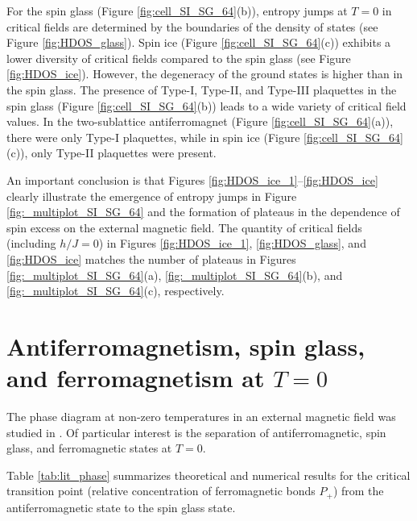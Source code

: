 \documentclass[preprint,12pt]{elsarticle}
\begin{document}
	For the spin glass (Figure \ref{fig:cell_SI_SG_64}(b)), entropy jumps at $T = 0$ in critical fields are determined by the boundaries of the density of states (see Figure \ref{fig:HDOS_glass}).
	Spin ice (Figure \ref{fig:cell_SI_SG_64}(c)) exhibits a lower diversity of critical fields compared to the spin glass (see Figure \ref{fig:HDOS_ice}). However, the degeneracy of the ground states is higher than in the spin glass.
	The presence of Type-I, Type-II, and Type-III plaquettes in the spin glass (Figure \ref{fig:cell_SI_SG_64}(b)) leads to a wide variety of critical field values. In the two-sublattice antiferromagnet (Figure \ref{fig:cell_SI_SG_64}(a)), there were only Type-I plaquettes, while in spin ice (Figure \ref{fig:cell_SI_SG_64}(c)), only Type-II plaquettes were present.
	
	An important conclusion is that Figures \ref{fig:HDOS_ice_1}–\ref{fig:HDOS_ice} clearly illustrate the emergence of entropy jumps in Figure \ref{fig:_multiplot_SI_SG_64} and the formation of plateaus in the dependence of spin excess on the external magnetic field.  
	The quantity of critical fields (including $h/J=0$) in Figures \ref{fig:HDOS_ice_1}, \ref{fig:HDOS_glass}, and \ref{fig:HDOS_ice} matches the number of plateaus in Figures \ref{fig:_multiplot_SI_SG_64}(a), \ref{fig:_multiplot_SI_SG_64}(b), and \ref{fig:_multiplot_SI_SG_64}(c), respectively.
	
	
	\section{Antiferromagnetism, spin glass, and ferromagnetism at $T = 0$}
	
	The phase diagram at non-zero temperatures in an external magnetic field was studied in \cite{trukhin2024thermodynamic}. Of particular interest is the separation of antiferromagnetic, spin glass, and ferromagnetic states at $T = 0$.
	
	Table \ref{tab:lit_phase} summarizes theoretical and numerical results for the critical transition point (relative concentration of ferromagnetic bonds $P_+$) from the antiferromagnetic state to the spin glass state.
	
\end{document}
